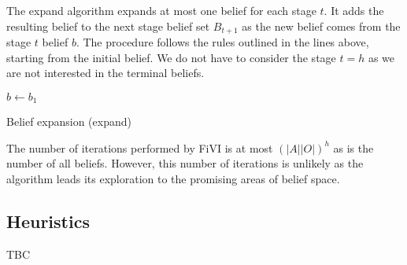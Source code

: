 The expand algorithm expands at most one belief for each stage $t$. It adds the resulting belief to the next stage belief set $B_{t + 1}$ as the new belief comes from the stage $t$ belief $b$. The procedure follows the rules outlined in the lines above, starting from the initial belief. We do not have to consider the stage $t = h$ as we are not interested in the terminal beliefs.

\LinesNumbered
\begin{algorithm}[H]
    
   
    \SetAlgoLined
    $ b \xleftarrow{} b_1$ \\
\caption{Belief expansion (expand)}
\end{algorithm}


The number of iterations performed by FiVI is at most $(|A||O|)^h$ as is the number of all beliefs. However, this number of iterations is unlikely as the algorithm leads its exploration to the promising areas of belief space.

\subsection{Heuristics}

TBC

   


